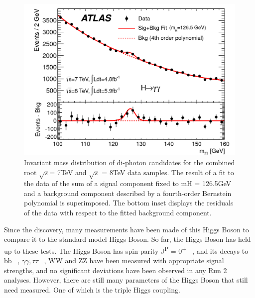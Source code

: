 \begin{figure}[h]
\begin{center}
\includegraphics[scale=0.25]{figures/higgs_disc}
\caption[Higgs boson mass peak]{Invariant mass distribution of di-photon candidates for the combined root $\sqrt{s}$= 7TeV and $\sqrt{s}$ = 8TeV data samples. The result of a fit to the data of the sum of a signal component fixed to mH = 126.5GeV and a background component described by a fourth-order Bernstein polynomial is superimposed. The bottom inset displays the residuals of the data with respect to the fitted background component.}
\label{fig:Higgs}
\end{center}
\end{figure}

Since the discovery, many measurements have been made of this Higgs Boson to compare it to the standard model Higgs Boson. So far, the Higgs Boson has held up to these tests. The Higgs Boson has spin-parity J\textsuperscript{P} = 0\textsuperscript{+} ~\cite{Aad:2013xqa}, and its decays to bb ~\cite{Aaboud:2018zhk}, ${\gamma\gamma, \tau\tau}$ ~\cite{Aaboud:2018pen}, WW and ZZ have been measured with appropriate signal strengths, and no significant deviations have been observed in any Run 2 analyses. However, there are still many parameters of the Higgs Boson that still need measured. One of which is the triple Higgs coupling.
